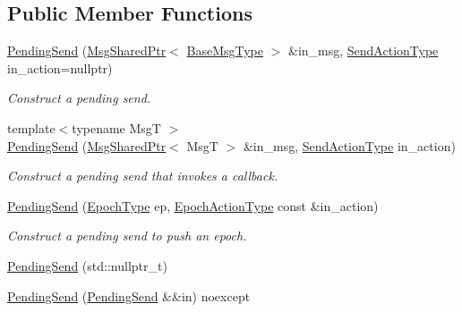 \subsection*{Public Member Functions}
\begin{DoxyCompactItemize}
\item 
\hyperlink{structvt_1_1messaging_1_1_pending_send_aa4fc0c9e2fcf09df43c923ac277ed6e7}{Pending\+Send} (\hyperlink{structvt_1_1messaging_1_1_msg_shared_ptr}{Msg\+Shared\+Ptr}$<$ \hyperlink{namespacevt_a44d0d4e144748f2b19a1cfd962f50338}{Base\+Msg\+Type} $>$ \&in\+\_\+msg, \hyperlink{structvt_1_1messaging_1_1_pending_send_aa13248a342d68230048cde8e0756851c}{Send\+Action\+Type} in\+\_\+action=nullptr)
\begin{DoxyCompactList}\small\item\em Construct a pending send. \end{DoxyCompactList}\item 
{\footnotesize template$<$typename MsgT $>$ }\\\hyperlink{structvt_1_1messaging_1_1_pending_send_a3409d31fed95e39a9a829f120cba8650}{Pending\+Send} (\hyperlink{structvt_1_1messaging_1_1_msg_shared_ptr}{Msg\+Shared\+Ptr}$<$ MsgT $>$ \&in\+\_\+msg, \hyperlink{structvt_1_1messaging_1_1_pending_send_aa13248a342d68230048cde8e0756851c}{Send\+Action\+Type} in\+\_\+action)
\begin{DoxyCompactList}\small\item\em Construct a pending send that invokes a callback. \end{DoxyCompactList}\item 
\hyperlink{structvt_1_1messaging_1_1_pending_send_afca579cd3975846e5555808fdf7d3f4c}{Pending\+Send} (\hyperlink{namespacevt_a81d11b28122d43bf9834577e4a06440f}{Epoch\+Type} ep, \hyperlink{structvt_1_1messaging_1_1_pending_send_a25131dc5a5e003dc65187edc97c23d1c}{Epoch\+Action\+Type} const \&in\+\_\+action)
\begin{DoxyCompactList}\small\item\em Construct a pending send to push an epoch. \end{DoxyCompactList}\item 
\hyperlink{structvt_1_1messaging_1_1_pending_send_a129a9c509eacf26111013105affe5931}{Pending\+Send} (std\+::nullptr\+\_\+t)
\item 
\hyperlink{structvt_1_1messaging_1_1_pending_send_ab791376e86901943595c93cce9cefbf6}{Pending\+Send} (\hyperlink{structvt_1_1messaging_1_1_pending_send}{Pending\+Send} \&\&in) noexcept
\item 

\end{DoxyCompactItemize}
